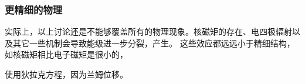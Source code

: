 \subsubsection{更精细的物理}


实际上，以上讨论还是不能够覆盖所有的物理现象。核磁矩的存在、电四极辐射以及其它一些机制会导致能级进一步分裂，产生。
这些效应都远远小于精细结构，如核磁矩相比电子磁矩是很小的，

使用狄拉克方程，因为兰姆位移。